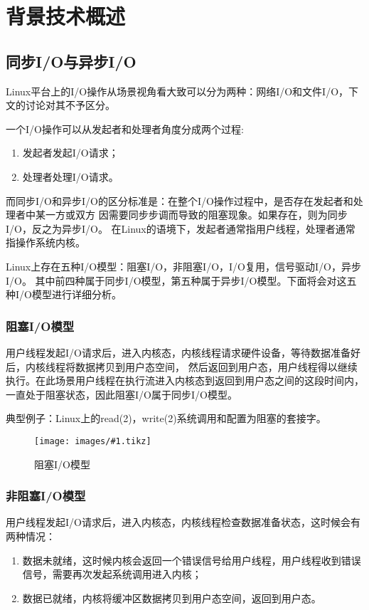 \documentclass[supercite]{HustGraduPaper}
\newcommand{\cfig}[3]{
  \begin{figure}[htb]
    \centering
    \texttt{[image: images/\#1.tikz]}
    \caption{#3}
    \label{fig:#1}
  \end{figure}
}
\theoremstyle{definition}
\begin{document}
\section{背景技术概述}
\subsection{同步I/O与异步I/O}
Linux平台上的I/O操作从场景视角看大致可以分为两种：网络I/O和文件I/O，下文的讨论对其不予区分。\par

一个I/O操作可以从发起者和处理者角度分成两个过程:
\begin{enumerate}
    \item 发起者发起I/O请求；
    \item 处理者处理I/O请求。
\end{enumerate}\par
而同步I/O和异步I/O的区分标准是：在整个I/O操作过程中，是否存在发起者和处理者中某一方或双方
因需要同步步调而导致的阻塞现象。如果存在，则为同步I/O，反之为异步I/O。
在Linux的语境下，发起者通常指用户线程，处理者通常指操作系统内核。\par

Linux上存在五种I/O模型：阻塞I/O，非阻塞I/O，I/O复用，信号驱动I/O，异步I/O。
其中前四种属于同步I/O模型，第五种属于异步I/O模型。下面将会对这五种I/O模型进行详细分析。\par

\subsubsection{阻塞I/O模型}
用户线程发起I/O请求后，进入内核态，内核线程请求硬件设备，等待数据准备好后，内核线程将数据拷贝到用户态空间，
然后返回到用户态，用户线程得以继续执行。在此场景用户线程在执行流进入内核态到返回到用户态之间的这段时间内，
一直处于阻塞状态，因此阻塞I/O属于同步I/O模型。\par

典型例子：Linux上的read(2)，write(2)系统调用和配置为阻塞的套接字。\par

\cfig{block-io}{0.5}{阻塞I/O模型}

\subsubsection{非阻塞I/O模型}
用户线程发起I/O请求后，进入内核态，内核线程检查数据准备状态，这时候会有两种情况：
\begin{enumerate}
  \item 数据未就绪，这时候内核会返回一个错误信号给用户线程，用户线程收到错误信号，需要再次发起系统调用进入内核；
  \item 数据已就绪，内核将缓冲区数据拷贝到用户态空间，返回到用户态。
\end{enumerate}
\end{document}
